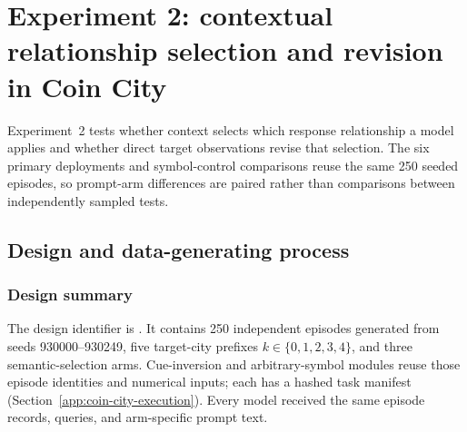 

\section{Experiment 2: contextual relationship selection and revision in Coin City}
\label{app:coin-city}

Experiment~2 tests whether context
selects which response relationship a model applies and whether direct target
observations revise that selection. The six primary deployments and symbol-control
comparisons reuse the same 250 seeded episodes, so prompt-arm differences are
paired rather than comparisons between independently sampled tests.

\subsection{Design and data-generating process}
\label{app:coin-city-design}

\subsubsection{Design summary}
The design identifier is
. It contains 250 independent
episodes generated from seeds 930000--930249, five target-city prefixes
\(k\in\{0,1,2,3,4\}\), and three semantic-selection arms. Cue-inversion and
arbitrary-symbol modules reuse those episode identities and numerical inputs; each
has a hashed task manifest (Section~\ref{app:coin-city-execution}). Every model received the same
episode records, queries, and arm-specific prompt text.

